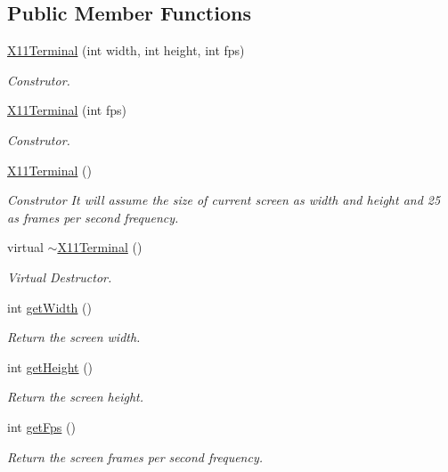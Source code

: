 \subsection*{Public Member Functions}
\begin{DoxyCompactItemize}
\item 
\hyperlink{classbr_1_1ufscar_1_1lince_1_1streaming_1_1X11Terminal_a2b6c293d655945d52e0d4d3ab7205e09}{X11Terminal} (int width, int height, int fps)
\begin{DoxyCompactList}\small\item\em Construtor. \item\end{DoxyCompactList}\item 
\hyperlink{classbr_1_1ufscar_1_1lince_1_1streaming_1_1X11Terminal_ade5b6ffc05bc6012ea5616812320e51e}{X11Terminal} (int fps)
\begin{DoxyCompactList}\small\item\em Construtor. \item\end{DoxyCompactList}\item 
\hyperlink{classbr_1_1ufscar_1_1lince_1_1streaming_1_1X11Terminal_a917bccc807324e153eabb87bc5dcc8e9}{X11Terminal} ()
\begin{DoxyCompactList}\small\item\em Construtor It will assume the size of current screen as width and height and 25 as frames per second frequency. \item\end{DoxyCompactList}\item 
virtual \hyperlink{classbr_1_1ufscar_1_1lince_1_1streaming_1_1X11Terminal_af2ad9a116dcaf89650ad95703fc1db09}{$\sim$X11Terminal} ()
\begin{DoxyCompactList}\small\item\em Virtual Destructor. \item\end{DoxyCompactList}\item 
int \hyperlink{classbr_1_1ufscar_1_1lince_1_1streaming_1_1X11Terminal_a97415fbf1c4a44664ba8d810ce77bf93}{getWidth} ()
\begin{DoxyCompactList}\small\item\em Return the screen width. \item\end{DoxyCompactList}\item 
int \hyperlink{classbr_1_1ufscar_1_1lince_1_1streaming_1_1X11Terminal_a5e2a1b9e3318b58b9d2c7b44dba5757e}{getHeight} ()
\begin{DoxyCompactList}\small\item\em Return the screen height. \item\end{DoxyCompactList}\item 
int \hyperlink{classbr_1_1ufscar_1_1lince_1_1streaming_1_1X11Terminal_ac4a3e267600e5be0296e86094d10c9ec}{getFps} ()
\begin{DoxyCompactList}\small\item\em Return the screen frames per second frequency. \item\end{DoxyCompactList}\end{DoxyCompactItemize}
